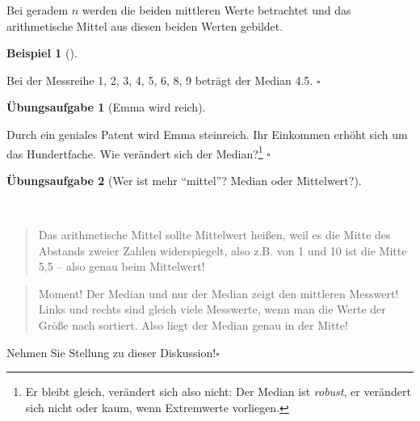 \documentclass[
  letterpaper,
  twoside,
  open=any]{scrbook}
\theoremstyle{definition}
\newtheorem{exercise}{Übungsaufgabe}[chapter]
\theoremstyle{definition}
\newtheorem{example}{Beispiel}[chapter]
\theoremstyle{definition}
\theoremstyle{remark}
\begin{document}
Bei geradem \(n\) werden die beiden mittleren Werte betrachtet und das
arithmetische Mittel aus diesen beiden Werten gebildet.

\begin{example}[]\protect\hypertarget{exm-med2}{}\label{exm-med2}

Bei der Messreihe 1, 2, 3, 4, 5, 6, 8, 9 beträgt der Median 4.5.
\(\square\)

\end{example}

\begin{exercise}[Emma wird
reich]\protect\hypertarget{exr-md2}{}\label{exr-md2}

Durch ein geniales Patent wird Emma steinreich. Ihr Einkommen erhöht
sich um das Hundertfache. Wie verändert sich der Median?\footnote{Er
  bleibt gleich, verändert sich also nicht: Der Median ist
  \emph{robust}, er verändert sich nicht oder kaum, wenn Extremwerte
  vorliegen.} \(\square\)

\end{exercise}

\begin{exercise}[Wer ist mehr \enquote{mittel}? Median oder
Mittelwert?]\protect\hypertarget{exr-mw-md}{}\label{exr-mw-md}

~

\begin{quote}
{} Das arithmetische Mittel sollte Mittelwert heißen,
weil es die Mitte des Abstands zweier Zahlen widerspiegelt, also z.B.
von 1 und 10 ist die Mitte 5,5 -- also genau beim Mittelwert!
\end{quote}

\begin{quote}
{} Moment! Der Median und nur der Median zeigt den
mittleren Messwert! Links und rechts sind gleich viele Messwerte, wenn
man die Werte der Größe nach sortiert. Also liegt der Median genau in
der Mitte!
\end{quote}

Nehmen Sie Stellung zu dieser Diskussion!\(\square\)

\end{exercise}
\end{document}
